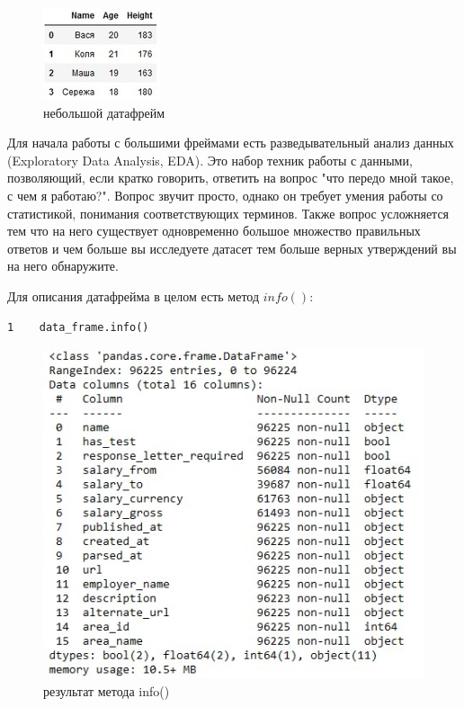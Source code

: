 \documentclass[12pt, a4paper]{article}
\begin{document}
{\begin{figure}[h]
    \begin{center}
        \includegraphics[keepaspectratio]
        {Pictures/Picture_3.jpg}
        \caption{небольшой датафрейм}
        \label{Picture_3}
    \end{center}
\end{figure}

Для начала работы с большими фреймами есть разведывательный 
анализ данных (Exploratory Data Analysis, EDA). Это набор 
техник работы с данными, позволяющий, если кратко говорить, 
ответить на вопрос "что передо мной такое, с чем я работаю?". 
Вопрос звучит просто, однако он требует умения работы со 
статистикой, понимания соответствующих терминов. Также вопрос 
усложняется тем что на него существует одновременно большое 
множество правильных ответов и чем больше вы исследуете датасет 
тем больше верных утверждений вы на него обнаружите.

\newpage

Для описания датафрейма в целом есть метод \(info()\):

\begin{verbatim}
1    data_frame.info()
\end{verbatim}

\begin{figure}[h]
    \begin{center}
        \includegraphics[scale=1,keepaspectratio]
        {Pictures/Picture_4.jpg}
        \caption{результат метода info()}
        \label{Picture_4}
    \end{center}
\end{figure}

}
\end{document}
